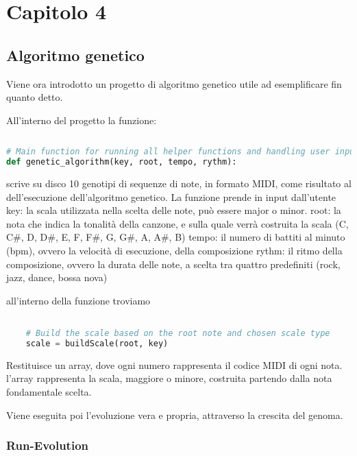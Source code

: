 \documentclass[a4paper,12pt]{report}
\begin{document}
\chapter*{Capitolo 4}
\section*{Algoritmo genetico}

Viene ora introdotto un progetto di algoritmo genetico utile ad esemplificare fin quanto detto.

All'interno del progetto la funzione:

\begin{lstlisting}[language=Python]
 
# Main function for running all helper functions and handling user input.
def genetic_algorithm(key, root, tempo, rythm):

\end{lstlisting}

scrive su disco 10 genotipi di sequenze di note, in formato MIDI, come risultato al dell'esecuzione dell'algoritmo genetico.
La funzione prende in input dall'utente
key: la scala utilizzata nella scelta delle note, può essere major o minor.
root: la nota che indica la tonalità della canzone, e sulla quale verrà costruita la scala (C, C#, D, D#, E, F, F#, G, G#, A, A#, B)
tempo: il numero di battiti al minuto (bpm), ovvero la velocità di esecuzione, della composizione
rythm: il ritmo della composizione, ovvero la durata delle note, a scelta tra quattro predefiniti (rock, jazz, dance, bossa nova)

all'interno della funzione troviamo

\begin{lstlisting}[language=Python]

    # Build the scale based on the root note and chosen scale type
    scale = buildScale(root, key)

\end{lstlisting}

Restituisce un array, dove ogni numero rappresenta il codice MIDI di ogni nota. l'array rappresenta la scala, maggiore o minore, costruita partendo dalla nota fondamentale scelta.

Viene eseguita poi l'evoluzione vera e propria, attraverso la crescita del genoma.

\subsection*{Run-Evolution}
\end{document}
